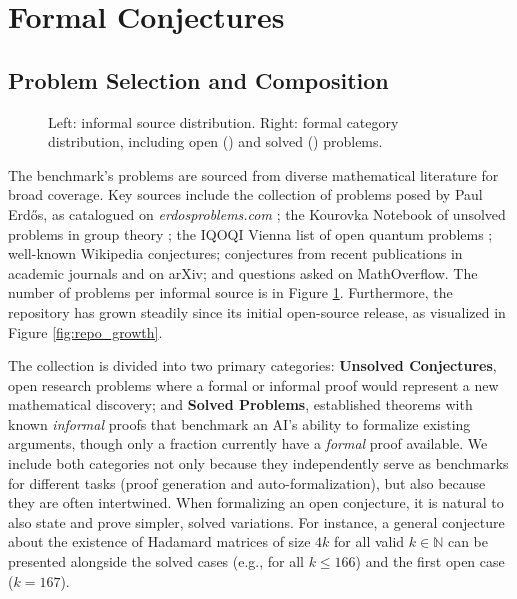 \section{Formal Conjectures}\label{sec:formal_conjectures}

\subsection{Problem Selection and Composition}

\begin{figure}[t!]
    \centering
    \resizebox{\textwidth}{!}{
        
    }
    \vspace{-10pt}
    \caption{Left: informal source distribution. Right: formal category distribution, including open (\fcCountResearchOpen) and solved (\fcCountResearchSolved) problems.}
    \label{fig:benchmark_pipeline}
\end{figure}





The benchmark's problems are sourced from diverse mathematical literature for broad coverage.
Key sources include the collection of problems posed by Paul Erd\H{o}s, as catalogued on \emph{erdosproblems.com} \citep{erdosproblems}; the Kourovka Notebook of unsolved problems in group theory \citep{kourovka}; the IQOQI Vienna list of open quantum problems \citep{oqp}; well-known Wikipedia conjectures; conjectures from recent publications in academic journals and on arXiv; and questions asked on MathOverflow.
The number of problems per informal source is in Figure \ref{fig:benchmark_pipeline}.
Furthermore, the repository has grown steadily since its initial open-source release, as visualized in Figure \ref{fig:repo_growth}.


The collection is divided into two primary categories: \textbf{Unsolved Conjectures}, open research problems where a formal or informal proof would represent a new mathematical discovery; and \textbf{Solved Problems}, established theorems with known \emph{informal} proofs that benchmark an AI's ability to formalize existing arguments, though only a fraction currently have a \emph{formal} proof available.
We include both categories not only because they independently serve as benchmarks for different tasks (proof generation and auto-formalization), but also because they are often intertwined.
When formalizing an open conjecture, it is natural to also state and prove simpler, solved variations.
For instance, a general conjecture about the existence of Hadamard matrices of size $4k$ for all valid $k \in \mathbb{N}$ can be presented alongside the solved cases (e.g., for all $k \le 166$) and the first open case ($k = 167$).


